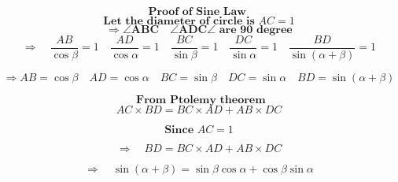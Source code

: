 \documentclass[10pt]{article}
\begin{document}
$$\textbf{Proof of Sine Law } $$
$$ \textbf{Let the diameter of circle is } \mathit{AC} = 1 $$
$$ \Rightarrow  \angle \textbf{ABC} \quad \angle\textbf{ADC} \angle \textbf{ are 90 degree}  $$
$$ \Rightarrow \quad \frac{AB}{\cos\beta} = 1 \quad \frac{AD}{\cos\alpha} = 1 \quad \frac{BC}{\sin\beta} = 1 \quad \frac{DC}{\sin\alpha} =1 \quad \frac{BD}{\sin (\alpha + \beta )} = 1$$

$$ \Rightarrow \mathit{AB} = \cos\beta \quad \mathit{AD} = \cos\alpha \quad \mathit{BC} = \sin\beta \quad \mathit{DC} = \sin\alpha  \quad \mathit{BD} = \sin(\alpha + \beta ) $$

$$ \textbf{ From 	Ptolemy theorem} $$
$$ \mathit{AC} \times\mathit{BD} = \mathit{BC}\times \mathit{AD} + \mathit{AB} \times\mathit{DC} $$

$$ \textbf{Since } \mathit{AC} = 1 $$

$$ \Rightarrow \quad \mathit{BD} = \mathit{BC}\times \mathit{AD} + \mathit{AB} \times\mathit{DC} $$

$$ \Rightarrow \quad \sin(\alpha + \beta ) = \sin\beta\cos\alpha + \cos\beta\sin\alpha $$
\end{document}

